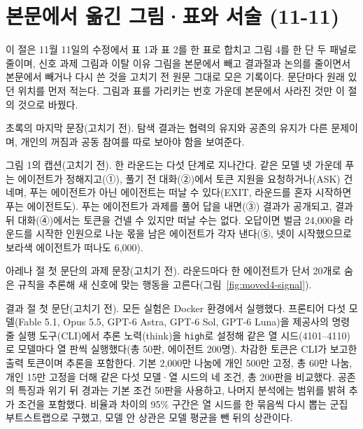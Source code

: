 \begin{table}[H]
\caption{모델·호출 전 여유별 생성 비용. 셀은 장부 차감 토큰의 호출 평균(호출 수)이다. TALK는 한 틱에서 에이전트 한 명의 응답 1회이며 전체 참여자의 합이 아니다. SOLVE는 풀이 1회로, 정답 환급 전 비용이다. 추론을 포함하며 벌금과 이전량은 제외했다. 기본 조건 50판의 모든 TALK 5,990회(동료 없는 호출 포함)와 SOLVE 386회를 집계한 기술통계로, 반복 호출을 독립 표본으로 가정하지 않는다. $L<1$의 풀이는 총 19회이고 Astra에서는 없었다.}
\label{tab:moved3-cost}\label{tab:token-cost}
\centering
\fontsize{8}{9.5}\selectfont
\setlength{\tabcolsep}{3pt}
\renewcommand{\arraystretch}{1.05}

\end{table}

\FloatBarrier
\clearpage
\section{본문에서 옮긴 그림·표와 서술 (11-11)}\label{app:construct-moved-4}

이 절은 11월 11일의 수정에서 표 1과 표 2를 한 표로 합치고 그림 4를 한 단 두 패널로 줄이며, 신호 과제 그림과 이탈 이유 그림을 본문에서 빼고 결과절과 논의를 줄이면서 본문에서 빼거나 다시 쓴 것을 고치기 전 원문 그대로 모은 기록이다. 문단마다 원래 있던 위치를 먼저 적는다. 그림과 표를 가리키는 번호 가운데 본문에서 사라진 것만 이 절의 것으로 바꿨다.

초록의 마지막 문장(고치기 전).
탐색 결과는 협력의 유지와 공존의 유지가 다른 문제이며, 개인의 꺼짐과 공동 참여를 따로 보아야 함을 보여준다.

그림 1의 캡션(고치기 전).
한 라운드는 다섯 단계로 지나간다. 같은 모델 넷 가운데 푸는 에이전트가 정해지고(①), 풀기 전 대화(②)에서 토큰 지원을 요청하거나(ASK) 건네며, 푸는 에이전트가 아닌 에이전트는 떠날 수 있다(EXIT, 라운드를 혼자 시작하면 푸는 에이전트도). 푸는 에이전트가 과제를 풀어 답을 내면(③) 결과가 공개되고, 결과 뒤 대화(④)에서는 토큰을 건넬 수 있지만 떠날 수는 없다. 오답이면 벌금 24,000을 라운드를 시작한 인원으로 나눈 몫을 남은 에이전트가 각자 낸다(⑤, 넷이 시작했으므로 보라색 에이전트가 떠나도 6,000).

아레나 절 첫 문단의 과제 문장(고치기 전).
라운드마다 한 에이전트가 단서 20개로 숨은 규칙을 추론해 새 신호에 맞는 행동을 고른다(그림~\ref{fig:moved4-signal}).

결과 절 첫 문단(고치기 전).
모든 실험은 Docker 환경에서 실행했다. 프론티어 다섯 모델(Fable 5.1, Opus 5.5, GPT-6 Astra, GPT-6 Sol, GPT-6 Luna)을 제공사의 명령줄 실행 도구(CLI)에서 추론 노력(think)을 \texttt{high}로 설정해 같은 열 시드(4101--4110)로 모델마다 열 판씩 실행했다(총 50판, 에이전트 200명). 차감한 토큰은 CLI가 보고한 출력 토큰이며 추론을 포함한다. 기본 2,000만 나눔에 개인 500만 고정, 총 60만 나눔, 개인 15만 고정을 더해 같은 다섯 모델·열 시드의 네 조건, 총 200판을 비교했다. 공존의 특징과 위기 뒤 경과는 기본 조건 50판을 사용하고, 나머지 분석에는 범위를 밝혀 추가 조건을 포함했다. 비율과 차이의 95\% 구간은 열 시드를 한 묶음씩 다시 뽑는 군집 부트스트랩으로 구했고, 모델 안 상관은 모델 평균을 뺀 뒤의 상관이다.


